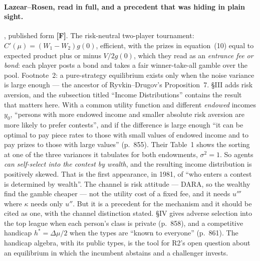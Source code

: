 \documentclass[11pt,a4paper]{article}
\begin{document}
\paragraph{Lazear--Rosen, read in full, and a precedent that was hiding in
plain sight.} \citet{LazearRosen1981}, published form \textbf{[F]}. The
risk-neutral two-player tournament: $C'(\mu) = (W_1 - W_2) g(0)$, efficient,
with the prizes in equation~(10) equal to expected product plus or minus
$V/2g(0)$, which they read as an \emph{entrance fee or bond}: each player posts
a bond and takes a fair winner-take-all gamble over the pool. Footnote~2: a
pure-strategy equilibrium exists only when the noise variance is large enough
--- the ancestor of Ryvkin--Drugov's Proposition~7. \S III adds risk aversion,
and the subsection titled ``Income Distributions'' contains the result that
matters here. With a common utility function and different \emph{endowed}
incomes $y_0$, ``persons with more endowed income and smaller absolute risk
aversion are more likely to prefer contests'', and if the difference is large
enough ``it can be optimal to pay piece rates to those with small values of
endowed income and to pay prizes to those with large values'' (p.~855). Their
Table~1 shows the sorting at one of the three variances it tabulates for both
endowments, $\sigma^2 = 1$. So agents \emph{can self-select into the contest by
wealth}, and the resulting income distribution is positively skewed. That is the first appearance, in 1981, of ``who enters a contest is
determined by wealth''. The channel is risk attitude --- DARA, so the wealthy
find the gamble cheaper --- not the utility cost of a fixed fee, and it needs
$u'''$ where $\kappa$ needs only $u''$. But it is a precedent for the
mechanism and it should be cited as one, with the channel distinction stated.
\S IV gives adverse selection into the top league when each person's class is
private (p.~858), and a competitive handicap $h^* = \Delta\mu/2$ when the
types are ``known to everyone'' (p.~861). The handicap algebra, with its
public types, is the tool for R2's open question about an equilibrium in
which the incumbent abstains and a challenger invests.
\end{document}
